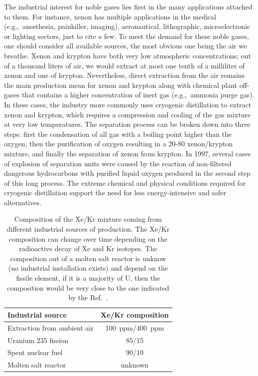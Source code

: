 \documentclass[main.tex]{subfiles}
\begin{document}
The industrial interest for noble gases lies first in the many applications attached to them. For instance, xenon has multiple applications in the medical (e.g.,\ anesthesia, painkiller, imaging),\autocite{cullen1951anesthetic, holstrater2011intranasal,Mammarappallil_2019} aeronautical\autocite{Patterson_2002,Coxhill_2005}, lithographic\autocite{Abramov_2018}, microelectronic\autocite{Chang_1995} or lighting sectors,\autocite{Jarman_1974,Tanaka_2019} just to cite a few. To meet the demand for these noble gases, one should consider all available sources, the most obvious one being the air we breathe. Xenon and krypton have both very low atmospheric concentrations; out of a thousand liters of air, we would extract at most one tenth of a milliliter of xenon and one of krypton.\autocite{kerry2007industrial} Nevertheless, direct extraction from the air remains the main production mean for xenon and krypton along with chemical plant off-gases that contains a higher concentration of inert gas (e.g.,\ ammonia purge gas). In these cases, the industry more commonly uses cryogenic distillation to extract xenon and krypton, which requires a compression and cooling of the gas mixture at very low temperatures. The separation process can be broken down into three steps: first the condensation of all gas with a boiling point higher than the oxygen, then the purification of oxygen resulting in a 20-80 xenon/krypton mixture, and finally the separation of xenon from krypton. In 1997, several cases of explosion of separation units were caused by the reaction of non-filtered dangerous hydrocarbons with purified liquid oxygen produced in the second step of this long process.\autocite{distill_accident,distill_accident2} The extreme chemical and physical conditions required for cryogenic distillation support the need for less energy-intensive and safer alternatives. 

\begin{table}[ht]
\setlength{\extrarowheight}{1pt}
\centering
\begin{tabular}{|l|c|}
  \hline
  Industrial source  &  Xe/Kr composition  \\
  \hline
  Extraction from ambient air\autocite{kerry2007industrial} &  100~ppm/400~ppm  \\[0.5mm]
  Uranium 235 fission\autocite{Blades_1956} &  85/15 \\[0.5mm]
  Spent nuclear fuel\autocite{auerbach2003handbook} &  90/10  \\[0.5mm]
  Molten salt reactor\autocite{engel1971xenon,Riley_2019} &  unknown \\[0.5mm]
  \hline
\end{tabular}
\caption{Composition of the Xe/Kr mixture coming from different industrial sources of production. The Xe/Kr composition can change over time depending on the radioactive decay of Xe and Kr isotopes. The composition out of a molten salt reactor is unknow (no industrial installation exists) and depend on the fissile element, if it is a majority of U, then the composition would be very close to the one indicated by the Ref.~\cite{Blades_1956}. }
\label{tab:indus_app}
\end{table}
\end{document}
